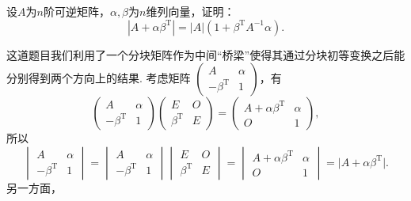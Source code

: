 \begin{exercise}
\begin{exgroup}
        \item 设$A$为$n$阶可逆矩阵，$\alpha,\beta$为$n$维列向量，证明：
        \[|A+\alpha\beta^{\mathrm{T}}|=|A|(1+\beta^\mathrm{T}A^{-1}\alpha).\]
        \begin{answer}
            这道题目我们利用了一个分块矩阵作为中间``桥梁''使得其通过分块初等变换之后能分别得到两个方向上的结果. 考虑矩阵 $\begin{pmatrix}
                A                   & \alpha \\
                -\beta^{\mathrm{T}} & 1
            \end{pmatrix}$，有
            \[\begin{pmatrix}
                    A                   & \alpha \\
                    -\beta^{\mathrm{T}} & 1
                \end{pmatrix} \begin{pmatrix}
                    E                  & O \\
                    \beta^{\mathrm{T}} & E
                \end{pmatrix} = \begin{pmatrix}
                    A+\alpha \beta^{\mathrm{T}} & \alpha \\
                    O                           & 1
                \end{pmatrix},\]
            所以
            \[\begin{vmatrix}
                    A                   & \alpha \\
                    -\beta^{\mathrm{T}} & 1
                \end{vmatrix} = \begin{vmatrix}
                    A                   & \alpha \\
                    -\beta^{\mathrm{T}} & 1
                \end{vmatrix} \begin{vmatrix}
                    E                  & O \\
                    \beta^{\mathrm{T}} & E
                \end{vmatrix} = \begin{vmatrix}
                    A+\alpha \beta^{\mathrm{T}} & \alpha \\
                    O                           & 1
                \end{vmatrix} = \lvert A+\alpha \beta^{\mathrm{T}} \rvert.\]
            另一方面，

\end{answer}
\end{exgroup}
\end{exercise}
